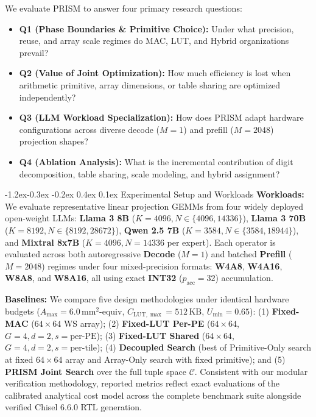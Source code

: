 \documentclass[10pt,letterpaper,twocolumn]{article}
\makeatletter
\renewcommand\subsection{\@startsection{subsection}{2}{\z@}%
  {-1.2ex\@plus -0.3ex \@minus -0.2ex}%
  {0.4ex \@plus 0.1ex}%
  {\normalfont\normalsize\bfseries}}
\makeatother
\begin{document}
We evaluate PRISM to answer four primary research questions:
\begin{itemize}
  \setlength{\itemsep}{1pt}\setlength{\parskip}{0pt}
  \item \textbf{Q1 (Phase Boundaries \& Primitive Choice):} Under what precision, reuse, and array scale regimes do MAC, LUT, and Hybrid organizations prevail?
  \item \textbf{Q2 (Value of Joint Optimization):} How much efficiency is lost when arithmetic primitive, array dimensions, or table sharing are optimized independently?
  \item \textbf{Q3 (LLM Workload Specialization):} How does PRISM adapt hardware configurations across diverse decode ($M=1$) and prefill ($M=2048$) projection shapes?
  \item \textbf{Q4 (Ablation Analysis):} What is the incremental contribution of digit decomposition, table sharing, scale modeling, and hybrid assignment?
\end{itemize}

\subsection{Experimental Setup and Workloads}
\textbf{Workloads:} We evaluate representative linear projection GEMMs from four widely deployed open-weight LLMs: \textbf{Llama 3 8B} ($K=4096, N \in \{4096, 14336\}$), \textbf{Llama 3 70B} ($K=8192, N \in \{8192, 28672\}$), \textbf{Qwen 2.5 7B} ($K=3584, N \in \{3584, 18944\}$), and \textbf{Mixtral 8x7B} ($K=4096, N=14336$ per expert). Each operator is evaluated across both autoregressive \textbf{Decode} ($M=1$) and batched \textbf{Prefill} ($M=2048$) regimes under four mixed-precision formats: \textbf{W4A8}, \textbf{W4A16}, \textbf{W8A8}, and \textbf{W8A16}, all using exact \textbf{INT32} ($p_{\text{acc}}=32$) accumulation.

\textbf{Baselines:} We compare five design methodologies under identical hardware budgets ($A_{\max} = 6.0\,\text{mm}^2$-equiv, $C_{\text{LUT},\max} = 512\,\text{KB}$, $U_{\min} = 0.65$): (1) \textbf{Fixed-MAC} ($64 \times 64$ WS array); (2) \textbf{Fixed-LUT Per-PE} ($64 \times 64$, $G=4, d=2, s=\text{per-PE}$); (3) \textbf{Fixed-LUT Shared} ($64 \times 64$, $G=4, d=2, s=\text{per-tile}$); (4) \textbf{Decoupled Search} (best of Primitive-Only search at fixed $64 \times 64$ array and Array-Only search with fixed primitive); and (5) \textbf{PRISM Joint Search} over the full tuple space $\mathcal{C}$. Consistent with our modular verification methodology, reported metrics reflect exact evaluations of the calibrated analytical cost model across the complete benchmark suite alongside verified Chisel 6.6.0 RTL generation.
\end{document}
